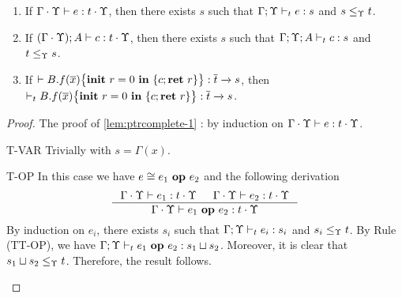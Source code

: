 {{{\begin{lemma}\label{lem:ptrcomplete}
\begin{enumerate}[label=(\alph*),topsep=1pt,itemsep=-1ex,partopsep=1ex,parsep=0ex]
\item\label{lem:ptrcomplete-1} If $\Gamma\cdot\Upsilon \vdash e : t\cdot \Upsilon$, then there exists $s$ such that $\Gamma;\Upsilon \vdash_{t} e : s$ and $s \leq_{\Upsilon} t$.\\
\item\label{lem:ptrcomplete-2} If $(\Gamma\cdot\Upsilon); A \vdash c : t\cdot \Upsilon$, then there exists $s$ such that $\Gamma;\Upsilon;A \vdash_{t} c : s$ and $t \leq_{\Upsilon} s$.\\
\item\label{lem:ptrcomplete-3} If $\vdash {B.f}(\overline{x})\big\{{{\textbf{init}~ {r}=0 ~\textbf{in}~\{{c};\textbf{ret}~{r}\}}}\big\}  : \overline{t}\xrightarrow{} s$, then $\vdash_{t} {B.f}(\overline{x})\big\{{{\textbf{init}~ {r}=0 ~\textbf{in}~\{{c};\textbf{ret}~{r}\}}}\big\}: \overline{t}\xrightarrow{} s$.
\end{enumerate}
\end{lemma}

\begin{proof}
The proof of \ref{lem:ptrcomplete-1} : by induction on $\Gamma\cdot\Upsilon \vdash e : t\cdot \Upsilon $.
\begin{ProofEnumDesc}
\item[T-VAR] Trivially with $s = \Gamma(x)$.


\item[T-OP]  In this case we have $e \cong {e_1}~\textbf{op}~{e_2}$ and the following derivation
\begin{equation*}
\inference
{\Gamma\cdot\trace\vdash e_1 : t\cdot\trace & \Gamma\cdot\trace \vdash e_2 : t\cdot\trace}
{\Gamma\cdot\trace\vdash \leOP{e_1}{e_2} : t\cdot\trace}
\end{equation*}
By induction on $e_i$, there exists $s_i$ such that $\Gamma; \Upsilon \vdash_{t} e_i : s_i$ and $s_i \leq_{\Upsilon} t$.
By Rule {(TT-OP)}, we have $\Gamma; \Upsilon\vdash_{t} {e_1}~\textbf{op}~{e_2} : s_1 \sqcup s_2$.
Moreover, it is clear that $s_1 \sqcup s_2 \leq_{\Upsilon} t$. Therefore, the result follows.


\end{ProofEnumDesc}
\end{proof}}}}
